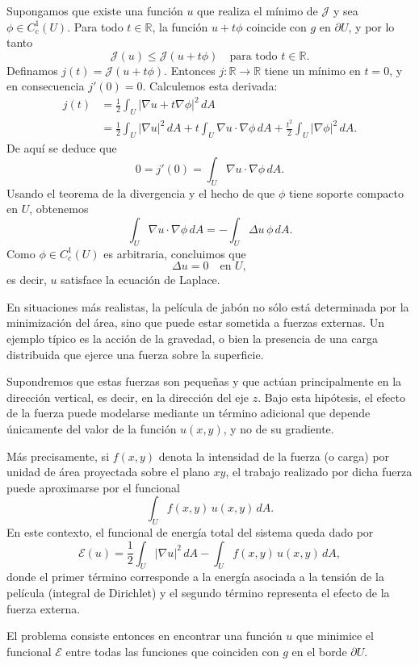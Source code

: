 \documentclass[12pt, a4paper]{amsbook}
\newcommand{\R}{{\mathbb R}}
\newcommand{\Ec}{{\mathcal E}}
\newcommand{\J}{{\mathcal J}}
\theoremstyle{remark}
\theoremstyle{definition}
\numberwithin{section}{chapter}
\numberwithin{subsection}{section}
\numberwithin{equation}{section}
\numberwithin{figure}{chapter}
\begin{document}
Supongamos que existe una función $u$ que realiza el mínimo de $\J$ y sea $\phi\in C_c^1(U)$. Para todo $t\in\R$, la función $u+t\phi$ coincide con $g$ en $\partial U$, y por lo tanto
\[
\J(u)\le \J(u+t\phi)\quad \text{para todo }t\in\R.
\]
Definamos $j(t)=\J(u+t\phi)$. Entonces $j\colon\R\to\R$ tiene un mínimo en $t=0$, y en consecuencia $j'(0)=0$. Calculemos esta derivada:
\begin{align*}
j(t)
&=\frac12\int_U |\nabla u+t\nabla\phi|^2\,dA \\
&=\frac12\int_U |\nabla u|^2\,dA
+ t\int_U \nabla u\cdot\nabla\phi\,dA
+ \frac{t^2}{2}\int_U |\nabla\phi|^2\,dA.
\end{align*}
De aquí se deduce que
\[
0=j'(0)=\int_U \nabla u\cdot\nabla\phi\,dA.
\]
Usando el teorema de la divergencia y el hecho de que $\phi$ tiene soporte compacto en $U$, obtenemos
\[
\int_U \nabla u\cdot\nabla\phi\,dA
= -\int_U \Delta u\,\phi\,dA.
\]
Como $\phi\in C_c^1(U)$ es arbitraria, concluimos que
\[
\Delta u = 0 \quad \text{en } U,
\]
es decir, $u$ satisface la ecuación de Laplace.

En situaciones más realistas, la película de jabón no sólo está determinada por la minimización del área, sino que puede estar sometida a fuerzas externas. Un ejemplo típico es la acción de la gravedad, o bien la presencia de una carga distribuida que ejerce una fuerza sobre la superficie.

Supondremos que estas fuerzas son pequeñas y que actúan principalmente en la dirección vertical, es decir, en la dirección del eje $z$. Bajo esta hipótesis, el efecto de la fuerza puede modelarse mediante un término adicional que depende únicamente del valor de la función $u(x,y)$, y no de su gradiente.

Más precisamente, si $f(x,y)$ denota la intensidad de la fuerza (o carga) por unidad de área proyectada sobre el plano $xy$, el trabajo realizado por dicha fuerza puede aproximarse por el funcional
\[
\int_U f(x,y)\,u(x,y)\,dA.
\]
En este contexto, el funcional de energía total del sistema queda dado por
\[
\Ec(u)
= \frac12 \int_U |\nabla u|^2\,dA
- \int_U f(x,y)\,u(x,y)\,dA,
\]
donde el primer término corresponde a la energía asociada a la tensión de la película (integral de Dirichlet) y el segundo término representa el efecto de la fuerza externa.

El problema consiste entonces en encontrar una función $u$ que minimice el funcional $\Ec$ entre todas las funciones que coinciden con $g$ en el borde $\partial U$.
\end{document}
